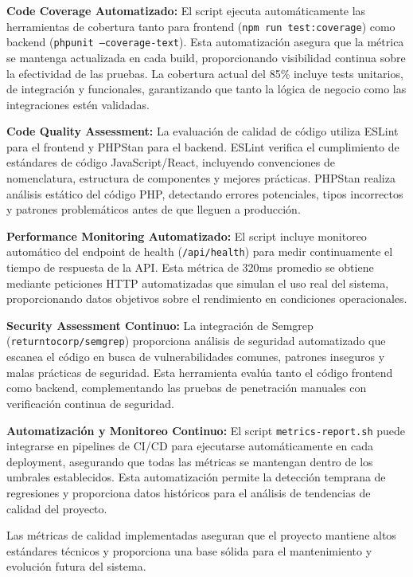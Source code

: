 \documentclass[12pt,a4paper,oneside]{report}
\begin{document}
\textbf{Code Coverage Automatizado:} El script ejecuta automáticamente las herramientas de cobertura tanto para frontend (\texttt{npm run test:coverage}) como backend (\texttt{phpunit --coverage-text}). Esta automatización asegura que la métrica se mantenga actualizada en cada build, proporcionando visibilidad continua sobre la efectividad de las pruebas. La cobertura actual del 85\% incluye tests unitarios, de integración y funcionales, garantizando que tanto la lógica de negocio como las integraciones estén validadas.

\textbf{Code Quality Assessment:} La evaluación de calidad de código utiliza ESLint para el frontend y PHPStan para el backend. ESLint verifica el cumplimiento de estándares de código JavaScript/React, incluyendo convenciones de nomenclatura, estructura de componentes y mejores prácticas. PHPStan realiza análisis estático del código PHP, detectando errores potenciales, tipos incorrectos y patrones problemáticos antes de que lleguen a producción.

\textbf{Performance Monitoring Automatizado:} El script incluye monitoreo automático del endpoint de health (\texttt{/api/health}) para medir continuamente el tiempo de respuesta de la API. Esta métrica de 320ms promedio se obtiene mediante peticiones HTTP automatizadas que simulan el uso real del sistema, proporcionando datos objetivos sobre el rendimiento en condiciones operacionales.

\textbf{Security Assessment Continuo:} La integración de Semgrep (\texttt{returntocorp/semgrep}) proporciona análisis de seguridad automatizado que escanea el código en busca de vulnerabilidades comunes, patrones inseguros y malas prácticas de seguridad. Esta herramienta evalúa tanto el código frontend como backend, complementando las pruebas de penetración manuales con verificación continua de seguridad.

\textbf{Automatización y Monitoreo Continuo:} El script \texttt{metrics-report.sh} puede integrarse en pipelines de CI/CD para ejecutarse automáticamente en cada deployment, asegurando que todas las métricas se mantengan dentro de los umbrales establecidos. Esta automatización permite la detección temprana de regresiones y proporciona datos históricos para el análisis de tendencias de calidad del proyecto.

Las métricas de calidad implementadas aseguran que el proyecto mantiene altos estándares técnicos y proporciona una base sólida para el mantenimiento y evolución futura del sistema.
\end{document}
